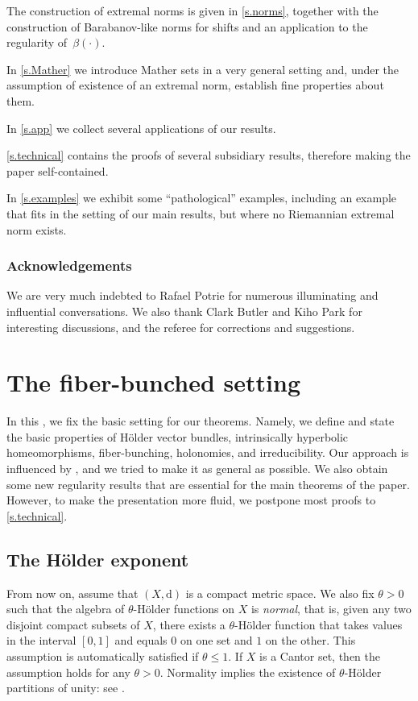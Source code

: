 \documentclass[10pt]{amsart}
\theoremstyle{plain}
\theoremstyle{definition}
\newcommand{\dd}{\mathrm{d}}
\begin{document}
The construction of extremal norms is given in \cref{s.norms}, together with the construction of Barabanov-like norms for shifts and an application to the regularity of~$\beta (\mathord{\cdot})$.

In \cref{s.Mather} we introduce Mather sets in a very general setting and, under the assumption of existence of an extremal norm, establish fine properties about them.

In \cref{s.app} we collect several applications of our results.

\cref{s.technical} contains the proofs of several subsidiary results, therefore making the paper self-contained.

In \cref{s.examples} we exhibit some ``pathological'' examples, including an example that fits in the setting of our main results, but where no Riemannian extremal norm exists.

\subsubsection*{Acknowledgements}
We are very much indebted to Rafael Potrie for numerous illuminating and influential conversations. We also thank Clark Butler and Kiho Park for interesting discussions, and the referee for corrections and suggestions.

\section{The fiber-bunched setting}\label{s.setting}

In this , we fix the basic setting for our theorems. Namely, we define and state the basic properties of Hölder vector bundles, intrinsically hyperbolic homeomorphisms, fiber-bunching, holonomies, and irreducibility. Our approach is influenced by \cite{BGV,Viana,KalSad}, and we tried to make it as general as possible.
We also obtain some new regularity results that are essential for the main theorems of the paper.
However, to make the presentation more fluid, we postpone most proofs to \cref{s.technical}.

\subsection{The Hölder exponent}\label{ss.theta}

From now on, assume that $(X,\dd)$ is a compact metric space.
We also fix $\theta > 0$ such that
the algebra of $\theta$-Hölder functions on $X$ is \emph{normal},
that is, given any two disjoint compact subsets of $X$, there exists a $\theta$-Hölder function that takes values in the interval $[0,1]$ and equals $0$ on one set and $1$ on the other. This assumption is automatically satisfied if $\theta \le 1$. If $X$ is a Cantor set, then the assumption holds for any $\theta>0$.
Normality implies the existence of $\theta$-Hölder partitions of unity: see \eg \cite[p.\,221]{Katz}.
\end{document}
